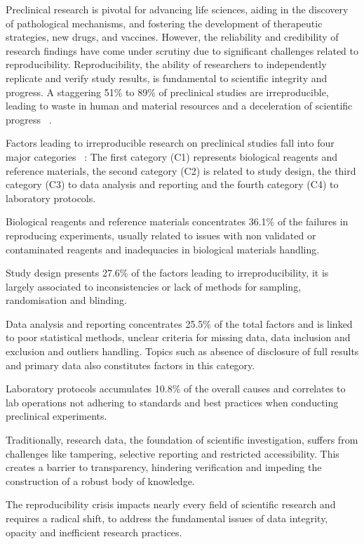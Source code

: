 Preclinical research is pivotal for advancing life sciences, aiding in the discovery of pathological mechanisms, and fostering the development of therapeutic strategies, new drugs, and vaccines. However, the reliability and credibility of research findings have come under scrutiny due to significant challenges related to reproducibility. Reproducibility, the ability of researchers to independently replicate and verify study results, is fundamental to scientific integrity and progress. A staggering 51\% to 89\% of preclinical studies are irreproducible, leading to waste in human and material resources and a deceleration of scientific progress ~\cite{freedman_economics_2015}.

Factors leading to irreproducible research on preclinical studies fall into four major categories ~\cite{freedman_economics_2015}: The first category (C1) represents biological reagents and reference materials, the second category (C2) is related to study design, the third category (C3) to data analysis and reporting and the fourth category (C4) to laboratory protocols.

Biological reagents and reference materials concentrates 36.1\% of the failures in reproducing experiments, usually related to issues with non validated or contaminated reagents and inadequacies in biological materials handling. 

Study design presents 27.6\% of the factors leading to irreproducibility, it is largely associated to inconsistencies or lack of methods for sampling, randomisation and blinding. 

Data analysis and reporting concentrates 25.5\% of the total factors and is linked to poor statistical methods, unclear criteria for missing data, data inclusion and exclusion and outliers handling. Topics such as absence of disclosure of full results and primary data also constitutes factors in this category. 

Laboratory protocols accumulates 10.8\% of the overall causes and correlates to lab operations not adhering to standards and best practices when conducting preclinical experiments.

Traditionally, research data, the foundation of scientific investigation, suffers from challenges like tampering, selective reporting and restricted accessibility. This creates a barrier to transparency, hindering verification and impeding the construction of a robust body of knowledge.

The reproducibility crisis impacts nearly every field of scientific research and requires a radical shift, to address the fundamental issues of data integrity, opacity and inefficient research practices.

